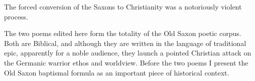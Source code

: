 
The forced conversion of the Saxons to Christianity was a notoriously violent process.

The two poems edited here form the totality of the Old Saxon poetic corpus. Both are Biblical, and although they are written in the language of traditional epic, apparently for a noble audience, they launch a pointed Christian attack on the Germanic warrior ethos and worldview.  Before the two poems I present the Old Saxon baptismal formula as an important piece of historical context.

\sectionline
